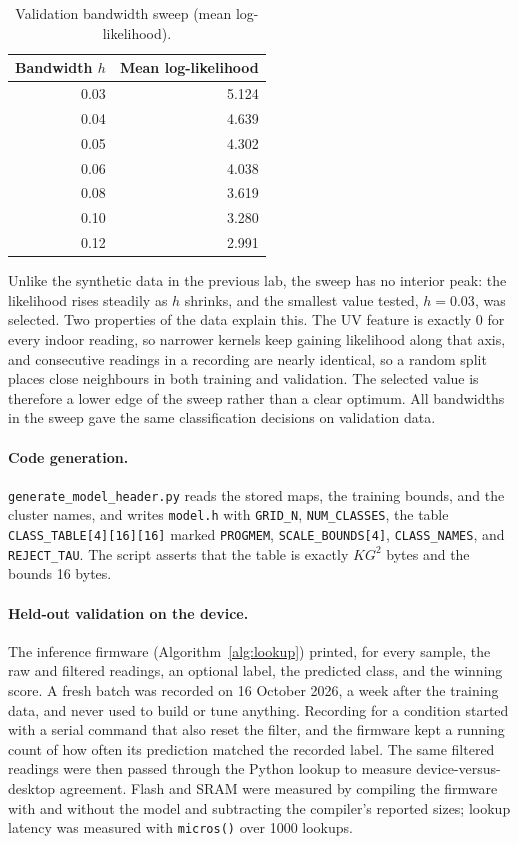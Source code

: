 \documentclass[10pt,a4paper,twocolumn]{article}
\begin{document}
\begin{table}[!bt]
\centering
\small
\caption{Validation bandwidth sweep (mean log-likelihood).}
\label{tab:bandwidth}
\begin{tabular}{@{}rr@{}}
\toprule
Bandwidth $h$ & Mean log-likelihood \\
\midrule
0.03 & 5.124 \\
0.04 & 4.639 \\
0.05 & 4.302 \\
0.06 & 4.038 \\
0.08 & 3.619 \\
0.10 & 3.280 \\
0.12 & 2.991 \\
\bottomrule
\end{tabular}
\end{table}

Unlike the synthetic data in the previous lab, the sweep has no interior peak: the likelihood rises steadily as $h$ shrinks, and the smallest value tested, $h = 0.03$, was selected. Two properties of the data explain this. The UV feature is exactly 0 for every indoor reading, so narrower kernels keep gaining likelihood along that axis, and consecutive readings in a recording are nearly identical, so a random split places close neighbours in both training and validation. The selected value is therefore a lower edge of the sweep rather than a clear optimum. All bandwidths in the sweep gave the same classification decisions on validation data.

\paragraph{Code generation.} \texttt{generate\_model\_header.py} reads the stored maps, the training bounds, and the cluster names, and writes \texttt{model.h} with \texttt{GRID\_N}, \texttt{NUM\_CLASSES}, the table \texttt{CLASS\_TABLE[4][16][16]} marked \texttt{PROGMEM}, \texttt{SCALE\_BOUNDS[4]}, \texttt{CLASS\_NAMES}, and \texttt{REJECT\_TAU}. The script asserts that the table is exactly $K G^2$ bytes and the bounds 16 bytes.

\paragraph{Held-out validation on the device.} The inference firmware (Algorithm~\ref{alg:lookup}) printed, for every sample, the raw and filtered readings, an optional label, the predicted class, and the winning score. A fresh batch was recorded on 16 October 2026, a week after the training data, and never used to build or tune anything. Recording for a condition started with a serial command that also reset the filter, and the firmware kept a running count of how often its prediction matched the recorded label. The same filtered readings were then passed through the Python lookup to measure device-versus-desktop agreement. Flash and SRAM were measured by compiling the firmware with and without the model and subtracting the compiler's reported sizes; lookup latency was measured with \texttt{micros()} over 1000 lookups.
\end{document}
